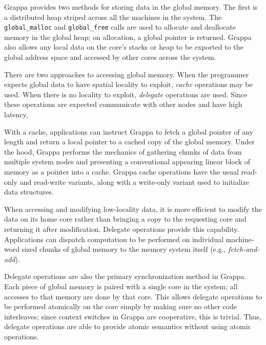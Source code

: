 Grappa provides two methods for storing data in the global memory. The
first is a distributed heap striped across all the machines in the
system. The \texttt{global\_malloc} and \texttt{global\_free} calls
are used to allocate and deallocate memory in the global heap; on
allocation, a global pointer is returned. Grappa also allows any local
data on the core's stacks or heap to be exported to the global address
space and accessed by other cores across the system.

There are two approaches to accessing global memory. When the
programmer expects global data to have spatial locality to exploit,
{\em cache} operations may be used. When there is no locality to
exploit, {\em delegate} operations are used. Since these operations
are expected communicate with other nodes and have high latency,

With a cache, applications can instruct Grappa to fetch a global
pointer of any length and return a local pointer to a cached copy of
the global memory. Under the hood, Grappa performs the mechanics of
gathering chunks of data from multiple system nodes and presenting a
conventional appearing linear block of memory as a pointer into a
cache. Grappa cache operations have the usual read-only and read-write
variants, along with a write-only variant used to initialize data
structures.

When accessing and modifying low-locality data, it is more efficient
to modify the data on its home core rather than bringing a copy to the
requesting core and returning it after modification. Delegate
operations provide this capability. Applications can dispatch
computation to be performed on individual machine-word sized chunks of
global memory to the memory system itself (e.g.,
\emph{fetch-and-add}).

Delegate operations are also the primary synchronization method in
Grappa. Each piece of global memory is paired with a single core in
the system; all accesses to that memory are done by that core. This
allows delegate operations to be performed atomically on the core
simply by making sure no other code interleaves; since context
switches in Grappa are cooperative, this is trivial. Thus, delegate
operations are able to provide atomic semantics without using atomic
operations.

